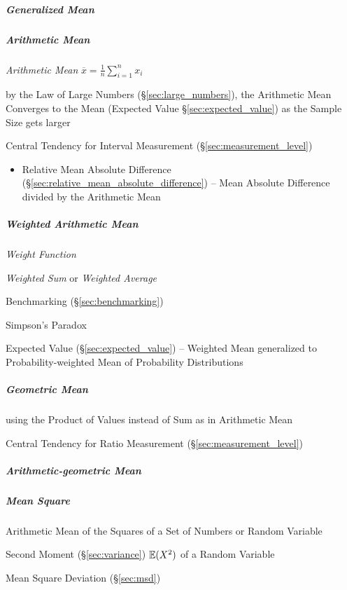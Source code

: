 \subparagraph{Generalized Mean}\label{sec:generalized_mean}\hfill


\subparagraph{Arithmetic Mean}\label{sec:arithmetic_mean}\hfill

\emph{Arithmetic Mean} $\overline{x} = \frac{1}{n}\sum_{i=1}^n x_i$

by the Law of Large Numbers (\S\ref{sec:large_numbers}), the Arithmetic Mean
Converges to the Mean (Expected Value \S\ref{sec:expected_value}) as the Sample
Size gets larger

Central Tendency for Interval Measurement (\S\ref{sec:measurement_level})

\begin{itemize}
  \item Relative Mean Absolute Difference
    (\S\ref{sec:relative_mean_absolute_difference}) -- Mean Absolute Difference
    divided by the Arithmetic Mean
\end{itemize}



\subparagraph{Weighted Arithmetic Mean}\label{sec:weighted_mean}\hfill

\emph{Weight Function}

\emph{Weighted Sum} or \emph{Weighted Average}

\fist Benchmarking (\S\ref{sec:benchmarking})

Simpson's Paradox

\fist Expected Value (\S\ref{sec:expected_value}) -- Weighted Mean generalized
to Probability-weighted Mean of Probability Distributions



\subparagraph{Geometric Mean}\label{sec:geometric_mean}\hfill

using the Product of Values instead of Sum as in Arithmetic Mean

Central Tendency for Ratio Measurement (\S\ref{sec:measurement_level})



\subparagraph{Arithmetic-geometric Mean}\label{sec:arithmetic_geometric}\hfill

\subparagraph{Mean Square}\label{sec:mean_square}\hfill

Arithmetic Mean of the Squares of a Set of Numbers or Random Variable

Second Moment (\S\ref{sec:variance}) $\mathbb{E}(X^2)$ of a Random Variable

\fist Mean Square Deviation (\S\ref{sec:msd})



